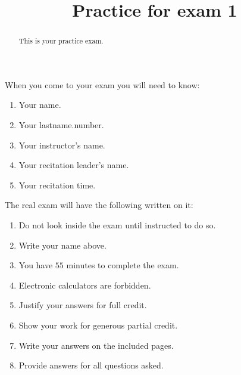 \documentclass{ximera}
\title{Practice for exam 1}
\begin{document}
\begin{abstract}
This is your practice exam.
\end{abstract}
\maketitle

When you come to your exam you will need to know:
\begin{enumerate}
\item Your name.
\item Your lastname.number.
\item Your instructor's name.
\item Your recitation leader's name.
\item Your recitation time.
\end{enumerate}

The real exam will have the following written on it:

\begin{enumerate}
\item Do not look inside the exam until instructed to do so.
\item Write your name above.
\item You have $55$ minutes to complete the exam.
\item Electronic calculators are forbidden.
\item Justify your answers for full credit.
\item Show your work for generous partial credit.
\item Write your answers on the included pages.
\item Provide answers for all questions asked.
\end{enumerate}
\end{document}
